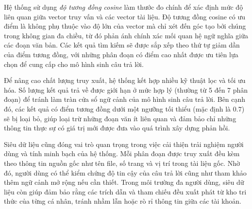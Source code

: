 Hệ thống sử dụng \emph{độ tương đồng cosine} làm thước đo chính để xác định mức độ liên quan giữa vector truy vấn và các vector tài liệu. Độ tương đồng cosine có ưu điểm là không phụ thuộc vào độ lớn của vector mà chỉ xét đến góc tạo bởi chúng trong không gian đa chiều, từ đó phản ánh chính xác mối quan hệ ngữ nghĩa giữa các đoạn văn bản. Các kết quả tìm kiếm sẽ được sắp xếp theo thứ tự giảm dần của điểm tương đồng, với những phân đoạn có điểm cao nhất được ưu tiên lựa chọn để cung cấp cho mô hình sinh câu trả lời.

Để nâng cao chất lượng truy xuất, hệ thống kết hợp nhiều kỹ thuật lọc và tối ưu hóa. Số lượng kết quả trả về được giới hạn ở mức hợp lý (thường từ 5 đến 7 phân đoạn) để tránh làm tràn cửa sổ ngữ cảnh của mô hình sinh câu trả lời. Bên cạnh đó, các kết quả có điểm tương đồng dưới một ngưỡng tối thiểu (mặc định là \(0.7\)) sẽ bị loại bỏ, giúp loại trừ những đoạn văn ít liên quan và đảm bảo chỉ những thông tin thực sự có giá trị mới được đưa vào quá trình xây dựng phản hồi.

Siêu dữ liệu cũng đóng vai trò quan trọng trong việc cải thiện trải nghiệm người dùng và tính minh bạch của hệ thống. Mỗi phân đoạn được truy xuất đều kèm theo thông tin nguồn gốc như tên file, số trang và vị trí trong tài liệu gốc. Nhờ đó, người dùng có thể kiểm chứng độ tin cậy của câu trả lời cũng như tham khảo thêm ngữ cảnh mở rộng nếu cần thiết. Trong môi trường đa người dùng, siêu dữ liệu còn giúp đảm bảo rằng các trích dẫn và tham chiếu đều xuất phát từ kho tri thức của từng cá nhân, tránh nhầm lẫn hoặc rò rỉ thông tin giữa các tài khoản.